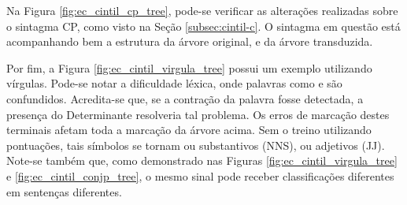 \begin{center}
    
\end{center}

Na Figura \ref{fig:ec_cintil_cp_tree}, pode-se verificar as alterações realizadas sobre o sintagma CP, como visto na Seção \ref{subsec:cintil-c}. O sintagma em questão está acompanhando bem a estrutura da árvore original, e da árvore transduzida.

\begin{center}
    
\end{center}

Por fim, a Figura \ref{fig:ec_cintil_virgula_tree} possui um exemplo utilizando vírgulas.
Pode-se notar a dificuldade léxica, onde palavras como  e  são confundidos. Acredita-se que, se a contração da palavra  fosse detectada, a presença do Determinante resolveria tal problema. Os erros de marcação destes terminais afetam toda a marcação da árvore acima. Sem o treino utilizando pontuações, tais símbolos se tornam ou substantivos (NNS), ou adjetivos (JJ). Note-se também que, como demonstrado nas Figuras \ref{fig:ec_cintil_virgula_tree} e \ref{fig:ec_cintil_conjp_tree}, o mesmo sinal pode receber classificações diferentes em sentenças diferentes.
